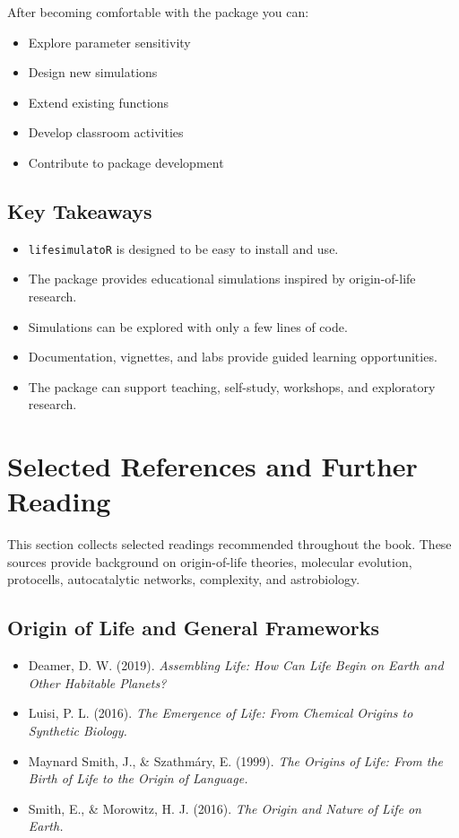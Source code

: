\documentclass[
  oneside,
  openany]{book}
\providecommand{\tightlist}{%
  \setlength{\itemsep}{0pt}\setlength{\parskip}{0pt}}
\begin{document}
After becoming comfortable with the package you can:

\begin{itemize}
\tightlist
\item
  Explore parameter sensitivity
\item
  Design new simulations
\item
  Extend existing functions
\item
  Develop classroom activities
\item
  Contribute to package development
\end{itemize}

\section{Key Takeaways}\label{key-takeaways-7}

\begin{itemize}
\tightlist
\item
  \texttt{lifesimulatoR} is designed to be easy to install and use.
\item
  The package provides educational simulations inspired by origin-of-life research.
\item
  Simulations can be explored with only a few lines of code.
\item
  Documentation, vignettes, and labs provide guided learning opportunities.
\item
  The package can support teaching, self-study, workshops, and exploratory research.
\end{itemize}

\chapter{Selected References and Further Reading}\label{selected-references-and-further-reading}

This section collects selected readings recommended throughout the book. These sources provide background on origin-of-life theories, molecular evolution, protocells, autocatalytic networks, complexity, and astrobiology.

\section{Origin of Life and General Frameworks}\label{origin-of-life-and-general-frameworks}

\begin{itemize}
\tightlist
\item
  Deamer, D. W. (2019). \emph{Assembling Life: How Can Life Begin on Earth and Other Habitable Planets?}
\item
  Luisi, P. L. (2016). \emph{The Emergence of Life: From Chemical Origins to Synthetic Biology.}
\item
  Maynard Smith, J., \& Szathmáry, E. (1999). \emph{The Origins of Life: From the Birth of Life to the Origin of Language.}
\item
  Smith, E., \& Morowitz, H. J. (2016). \emph{The Origin and Nature of Life on Earth.}
\end{itemize}
\end{document}
